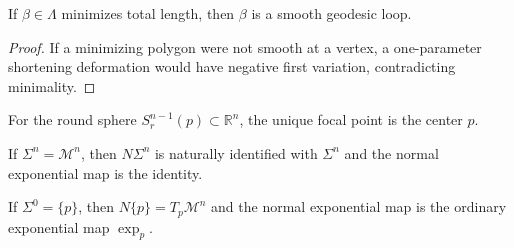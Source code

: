 \begin{lemma}
\label{appb-lem-minimizing-polygon-smooth}


If $\beta\in\Lambda$ minimizes total length, then $\beta$ is a smooth geodesic loop.
\end{lemma}

\begin{proof}
\sketch If a minimizing polygon were not smooth at a vertex, a one-parameter shortening deformation would have negative first variation, contradicting minimality.
\end{proof}

\begin{example}
\label{appb-ex-euclidean-sphere-focal-point}
For the round sphere $S_r^{n-1}(p)\subset\mathbb R^n$, the unique focal point is the center $p$.
\end{example}

\begin{example}
\label{appb-ex-normal-bundle-codim-zero}
If $\Sigma^n=\mathcal M^n$, then $N\Sigma^n$ is naturally identified with $\Sigma^n$ and the normal exponential map is the identity.
\end{example}

\begin{example}
\label{appb-ex-normal-bundle-point}
If $\Sigma^0=\{p\}$, then $N\{p\}=T_p\mathcal M^n$ and the normal exponential map is the ordinary exponential map $\exp_p$.
\end{example}

